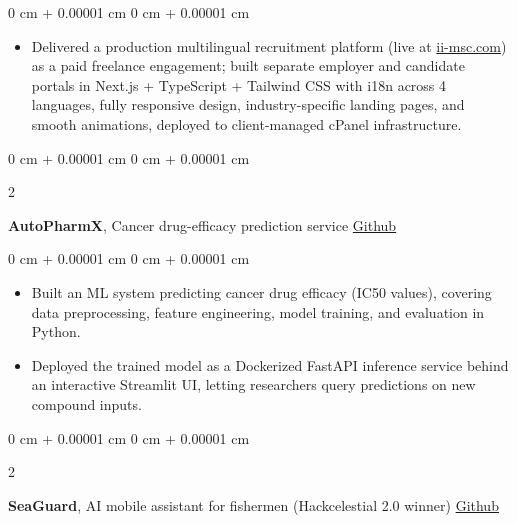 \documentclass[10pt, letterpaper]{article}
\newenvironment{highlights}{
    \begin{itemize}[
        topsep=0.10 cm,
        parsep=0.10 cm,
        partopsep=0pt,
        itemsep=0pt,
        leftmargin=0 cm + 10pt
    ]
}{
    \end{itemize}
} %
\newenvironment{onecolentry}{
    \begin{adjustwidth}{
        0 cm + 0.00001 cm
    }{
        0 cm + 0.00001 cm
    }
}{
    \end{adjustwidth}
} %
\newenvironment{twocolentry}[2][]{
    \onecolentry
    \def\secondColumn{#2}
    \setcolumnwidth{\fill, 4.5 cm}
    \begin{paracol}{2}
}{
    \switchcolumn \raggedleft \secondColumn
    \end{paracol}
    \endonecolentry
} %
\begin{document}
        \vspace{0.10 cm}
        \begin{onecolentry}
            \begin{highlights}
                \item Delivered a production multilingual recruitment platform (live at \href{https://ii-msc.com}{ii-msc.com}) as a paid freelance engagement; built separate employer and candidate portals in Next.js + TypeScript + Tailwind CSS with i18n across 4 languages, fully responsive design, industry-specific landing pages, and smooth animations, deployed to client-managed cPanel infrastructure.
            \end{highlights}
        \end{onecolentry}

        \vspace{0.2 cm}

        \begin{twocolentry}{
            \href{https://github.com/vinaypokharkar/autopharmax}{Github}
        }
            \textbf{AutoPharmX}, Cancer drug-efficacy prediction service \end{twocolentry}

        \vspace{0.10 cm}
        \begin{onecolentry}
            \begin{highlights}
                \item Built an ML system predicting cancer drug efficacy (IC50 values), covering data preprocessing, feature engineering, model training, and evaluation in Python.
                \item Deployed the trained model as a Dockerized FastAPI inference service behind an interactive Streamlit UI, letting researchers query predictions on new compound inputs.
            \end{highlights}
        \end{onecolentry}

        \vspace{0.2 cm}

        \begin{twocolentry}{
            \href{https://github.com/vinaypokharkar/SeaGuard}{Github}
        }
            \textbf{SeaGuard}, AI mobile assistant for fishermen (Hackcelestial 2.0 winner) \end{twocolentry}
\end{document}
